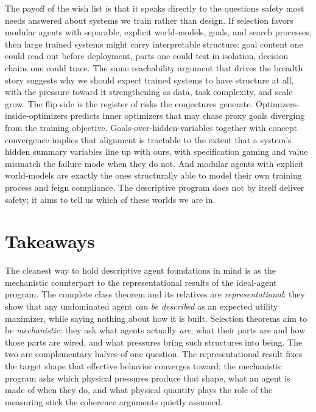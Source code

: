 \documentclass[10pt]{article}
\theoremstyle{definition}
\theoremstyle{remark}
\begin{document}
The payoff of the wish list is that it speaks directly to the questions safety most needs answered about systems we train rather than design. If selection favors modular agents with separable, explicit world-models, goals, and search processes, then large trained systems might carry interpretable structure: goal content one could read out before deployment, parts one could test in isolation, decision chains one could trace. The same reachability argument that drives the breadth story suggests why we should expect trained systems to have structure at all, with the pressure toward it strengthening as data, task complexity, and scale grow. The flip side is the register of risks the conjectures generate. Optimizers-inside-optimizers predicts inner optimizers that may chase proxy goals diverging from the training objective. Goals-over-hidden-variables together with concept convergence implies that alignment is tractable to the extent that a system's hidden summary variables line up with ours, with specification gaming and value mismatch the failure mode when they do not. And modular agents with explicit world-models are exactly the ones structurally able to model their own training process and feign compliance. The descriptive program does not by itself deliver safety; it aims to tell us which of these worlds we are in.

\section{Takeaways}
\label{sec:takeaways}

The cleanest way to hold descriptive agent foundations in mind is as the mechanistic counterpart to the representational results of the ideal-agent program. The complete class theorem and its relatives are \emph{representational}: they show that any undominated agent \emph{can be described} as an expected utility maximizer, while saying nothing about how it is built. Selection theorems aim to be \emph{mechanistic}: they ask what agents actually \emph{are}, what their parts are and how those parts are wired, and what pressures bring such structures into being. The two are complementary halves of one question. The representational result fixes the target shape that effective behavior converges toward; the mechanistic program asks which physical pressures produce that shape, what an agent is made of when they do, and what physical quantity plays the role of the measuring stick the coherence arguments quietly assumed.
\end{document}
